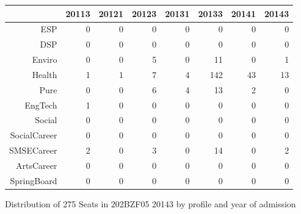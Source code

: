 \documentclass{article}\usepackage[]{graphicx}\usepackage[]{color}
\makeatletter
\newenvironment{kframe}{%
 \def\at@end@of@kframe{}%
 \ifinner\ifhmode%
  \def\at@end@of@kframe{\end{minipage}}%
  \begin{minipage}{\columnwidth}%
 \fi\fi%
 \def\FrameCommand##1{\hskip\@totalleftmargin \hskip-\fboxsep
 \colorbox{shadecolor}{##1}\hskip-\fboxsep
     \hskip-\linewidth \hskip-\@totalleftmargin \hskip\columnwidth}%
 \MakeFramed {\advance\hsize-\width
   \@totalleftmargin\z@ \linewidth\hsize
   \@setminipage}}%
 {\par\unskip\endMakeFramed%
 \at@end@of@kframe}
\makeatother
\begin{document}
\begin{figure}[H]
\centering
\begin{tabular}{rrrrrrrr}
  \hline
 & 20113 & 20121 & 20123 & 20131 & 20133 & 20141 & 20143 \\ 
  \hline
ESP &   0 &   0 &   0 &   0 &   0 &   0 &   0 \\ 
  DSP &   0 &   0 &   0 &   0 &   0 &   0 &   0 \\ 
  Enviro &   0 &   0 &   5 &   0 &  11 &   0 &   1 \\ 
  Health &   1 &   1 &   7 &   4 & 142 &  43 &  13 \\ 
  Pure &   0 &   0 &   6 &   4 &  13 &   2 &   0 \\ 
  EngTech &   1 &   0 &   0 &   0 &   0 &   0 &   0 \\ 
  Social &   0 &   0 &   0 &   0 &   0 &   0 &   0 \\ 
  SocialCareer &   0 &   0 &   0 &   0 &   0 &   0 &   0 \\ 
  SMSECareer &   2 &   0 &   3 &   0 &  14 &   0 &   2 \\ 
  ArtsCareer &   0 &   0 &   0 &   0 &   0 &   0 &   0 \\ 
  SpringBoard &   0 &   0 &   0 &   0 &   0 &   0 &   0 \\ 
   \hline
\end{tabular}
\caption{Distribution of 275 Seats in 202BZF05 20143 by profile and year of admission} 
\end{figure}
\begin{kframe}

{\ttfamily\noindent\bfseries\color{errorcolor}{\#\# Error in characters | factors: operations are possible only for numeric, logical or complex types}}\end{kframe}
\end{document}

